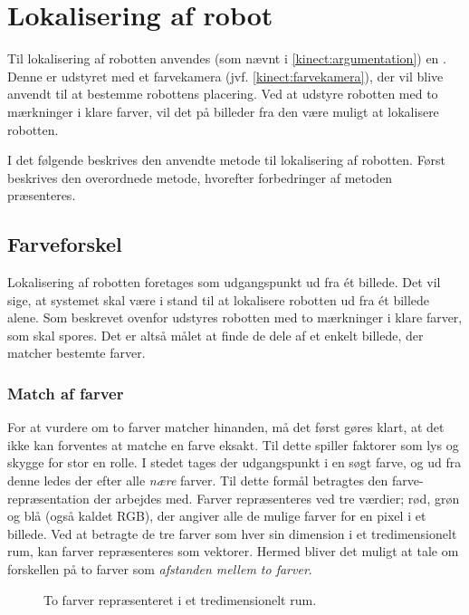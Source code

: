 \section{Lokalisering af robot}\label{tracking}
Til lokalisering af robotten anvendes (som nævnt i \cref{kinect:argumentation}) en \kinect.
Denne er udstyret med et farvekamera (jvf. \cref{kinect:farvekamera}), der vil blive anvendt til at bestemme robottens placering.
Ved at udstyre robotten med to mærkninger i klare farver, vil det på billeder fra den være muligt at lokalisere robotten.

I det følgende beskrives den anvendte metode til lokalisering af robotten.
Først beskrives den overordnede metode, hvorefter forbedringer af metoden præsenteres.

\subsection{Farveforskel}\label{tracking:colordiff}
Lokalisering af robotten foretages som udgangspunkt ud fra \'et billede.
Det vil sige, at systemet skal være i stand til at lokalisere robotten ud fra \'et billede alene.
Som beskrevet ovenfor udstyres robotten med to mærkninger i klare farver, som skal spores.
Det er altså målet at finde de dele af et enkelt billede, der matcher bestemte farver.

\subsubsection{Match af farver}
For at vurdere om to farver matcher hinanden, må det først gøres klart, at det ikke kan forventes at matche en farve eksakt.
Til dette spiller faktorer som lys og skygge for stor en rolle.
I stedet tages der udgangspunkt i en søgt farve, og ud fra denne ledes der efter alle \textit{nære} farver.
Til dette formål betragtes den farve-repræsentation der arbejdes med.
Farver repræsenteres ved tre værdier; rød, grøn og blå (også kaldet RGB), der angiver alle de mulige farver for en pixel i et billede.
Ved at betragte de tre farver som hver sin dimension i et tredimensionelt rum, kan farver repræsenteres som vektorer.
Hermed bliver det muligt at tale om forskellen på to farver som \textit{afstanden mellem to farver}.

\begin{figure}
\centering

\caption{To farver repræsenteret i et tredimensionelt rum.}
\label{tracking:colorspace}
\end{figure}

